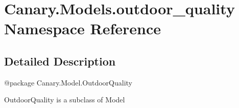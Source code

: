 \hypertarget{namespace_canary_1_1_models_1_1outdoor__quality}{\section{Canary.\-Models.\-outdoor\-\_\-quality Namespace Reference}
\label{namespace_canary_1_1_models_1_1outdoor__quality}
}


\subsection{Detailed Description}
\begin{DoxyVerb}@package Canary.Model.OutdoorQuality

OutdoorQuality is a subclass of Model
\end{DoxyVerb}
 